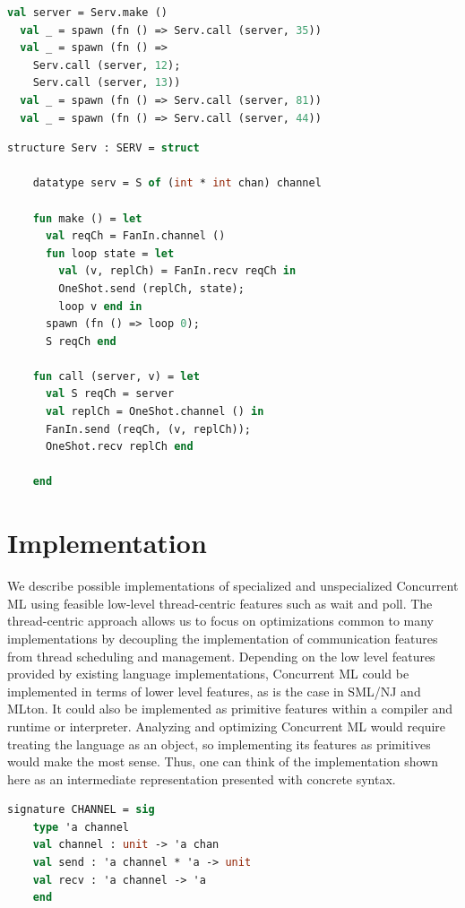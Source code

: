 \documentclass{article}
\begin{document}
\begin{lstlisting}[language=ML, escapechar=\%]
  val server = Serv.make ()
  val _ = spawn (fn () => Serv.call (server, 35))
  val _ = spawn (fn () => 
    Serv.call (server, 12); 
    Serv.call (server, 13))
  val _ = spawn (fn () => Serv.call (server, 81))
  val _ = spawn (fn () => Serv.call (server, 44))
  \end{lstlisting}

\begin{lstlisting}[language=ML, escapechar=\%]
  structure Serv : SERV = struct 

    datatype serv = S of (int * int chan) channel 

    fun make () = let 
      val reqCh = FanIn.channel ()
      fun loop state = let
        val (v, replCh) = FanIn.recv reqCh in 
        OneShot.send (replCh, state);
        loop v end in
      spawn (fn () => loop 0);
      S reqCh end 

    fun call (server, v) = let 
      val S reqCh = server
      val replCh = OneShot.channel () in 
      FanIn.send (reqCh, (v, replCh));
      OneShot.recv replCh end

    end
  \end{lstlisting}

\section{Implementation}
We describe possible implementations of specialized and unspecialized Concurrent ML using
feasible low-level thread-centric features such as wait and poll.  The thread-centric approach
allows us to focus on optimizations common to many implementations by decoupling the
implementation of communication features from thread scheduling and management.  Depending on
the low level features provided by existing language implementations, Concurrent ML could be
implemented in terms of lower level features, as is the case in SML/NJ and MLton.  It could
also be implemented as primitive features within a compiler and runtime or interpreter.
Analyzing and optimizing Concurrent ML would require treating the language as an object, so
implementing its features as primitives would make the most sense.  Thus, one can think of the
implementation shown here as an intermediate representation presented with concrete syntax.

\begin{lstlisting}[language=ML, escapechar=\%]
  signature CHANNEL = sig
    type 'a channel 
    val channel : unit -> 'a chan
    val send : 'a channel * 'a -> unit
    val recv : 'a channel -> 'a
    end     
\end{lstlisting}
\end{document}
